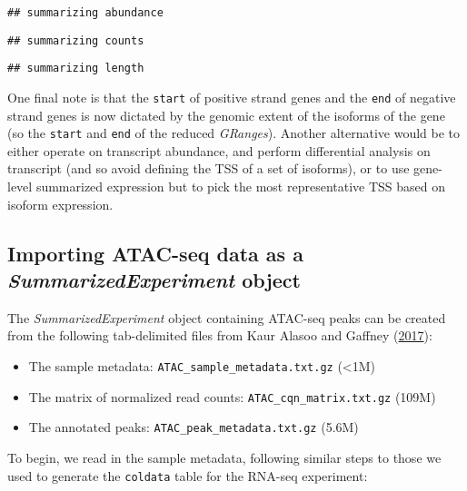 \documentclass[
]{article}
\newenvironment{Shaded}{}{}
\newcommand{\DataTypeTok}[1]{\textcolor[rgb]{0.56,0.13,0.00}{#1}}
\newcommand{\KeywordTok}[1]{\textcolor[rgb]{0.00,0.44,0.13}{\textbf{#1}}}
\newcommand{\NormalTok}[1]{#1}
\newcommand{\OperatorTok}[1]{\textcolor[rgb]{0.40,0.40,0.40}{#1}}
\newcommand{\StringTok}[1]{\textcolor[rgb]{0.25,0.44,0.63}{#1}}
\providecommand{\tightlist}{%
  \setlength{\itemsep}{0pt}\setlength{\parskip}{0pt}}
\begin{document}
\begin{verbatim}
## summarizing abundance
\end{verbatim}

\begin{verbatim}
## summarizing counts
\end{verbatim}

\begin{verbatim}
## summarizing length
\end{verbatim}

One final note is that the \texttt{start} of positive strand genes and the
\texttt{end} of negative strand genes is now dictated by the genomic extent of
the isoforms of the gene (so the \texttt{start} and \texttt{end} of the reduced \emph{GRanges}).
Another alternative would be to either operate on transcript
abundance, and perform differential analysis on transcript (and so
avoid defining the TSS of a set of isoforms), or to use gene-level
summarized expression but to pick the most representative TSS based on
isoform expression.

\hypertarget{atac}{%
\subsection{\texorpdfstring{Importing ATAC-seq data as a \emph{SummarizedExperiment} object}{Importing ATAC-seq data as a SummarizedExperiment object}}\label{atac}}

The \emph{SummarizedExperiment} object containing ATAC-seq peaks can be created from
the following tab-delimited files from Kaur Alasoo and Gaffney (\protect\hyperlink{ref-alasooZenodo}{2017}):

\begin{itemize}
\tightlist
\item
  The sample metadata: \texttt{ATAC\_sample\_metadata.txt.gz} (\textless1M)
\item
  The matrix of normalized read counts: \texttt{ATAC\_cqn\_matrix.txt.gz} (109M)
\item
  The annotated peaks: \texttt{ATAC\_peak\_metadata.txt.gz} (5.6M)
\end{itemize}

To begin, we read in the sample metadata, following similar steps to those we
used to generate the \texttt{coldata} table for the RNA-seq experiment:

\begin{Shaded}
\end{Shaded}
\end{document}
